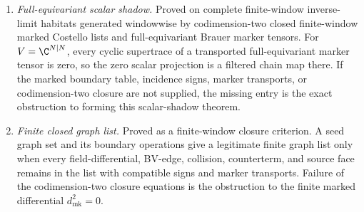 \begin{stmt}
\begin{enumerate}[label=(\arabic*)]
    \item \emph{Full-equivariant scalar shadow.}  Proved on complete
    finite-window inverse-limit habitats generated windowwise by
    codimension-two closed finite-window marked Costello lists and
    full-equivariant Brauer marker tensors.  For \(V=\C^{N|N}\), every
    cyclic supertrace of a transported full-equivariant marker tensor is
    zero, so the zero scalar projection is a filtered chain map there.
    If the marked boundary table, incidence signs, marker transports, or
    codimension-two closure are not supplied, the missing entry is the
    exact obstruction to forming this scalar-shadow theorem.

    \item \emph{Finite closed graph list.}  Proved as a finite-window
    closure criterion.  A seed graph set and its boundary operations give
    a legitimate finite graph list only when every field-differential,
    BV-edge, collision, counterterm, and source face remains in the list
    with compatible signs and marker transports.  Failure of the
    codimension-two closure equations is the obstruction to the finite
    marked differential \(d_{\mathrm{mk}}^2=0\).


\end{enumerate}
\end{stmt}
